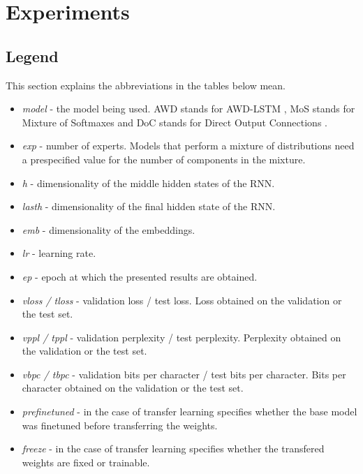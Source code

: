 \chapter{Experiments}

\section{Legend}
This section explains the abbreviations in the tables below mean.

\begin{itemize}
    \item \emph{model} - the model being used. AWD stands for AWD-LSTM \citep{merity2017regularizing}, MoS \citep{yang2017breaking} stands for Mixture of Softmaxes and DoC stands for Direct Output Connections \citep{takase2018direct}.
    \item \emph{exp} - number of experts. Models that perform a mixture of distributions need a prespecified value for the number of components in the mixture.
    \item \emph{h} - dimensionality of the middle hidden states of the RNN.
    \item \emph{lasth} - dimensionality of the final hidden state of the RNN.
    \item \emph{emb} - dimensionality of the embeddings.
    \item \emph{lr} - learning rate.
    \item \emph{ep} - epoch at which the presented results are obtained.
    \item \emph{vloss / tloss} - validation loss / test loss. Loss obtained on the validation or the test set.
    \item \emph{vppl / tppl} - validation perplexity / test perplexity. Perplexity obtained on the validation or the test set.
    \item \emph{vbpc / tbpc} - validation bits per character / test bits per character. Bits per character obtained on the validation or the test set.
    \item \emph{prefinetuned} - in the case of transfer learning specifies whether the base model was finetuned before transferring the weights.
    \item \emph{freeze} - in the case of transfer learning specifies whether the transfered weights are fixed or trainable.
\end{itemize}

